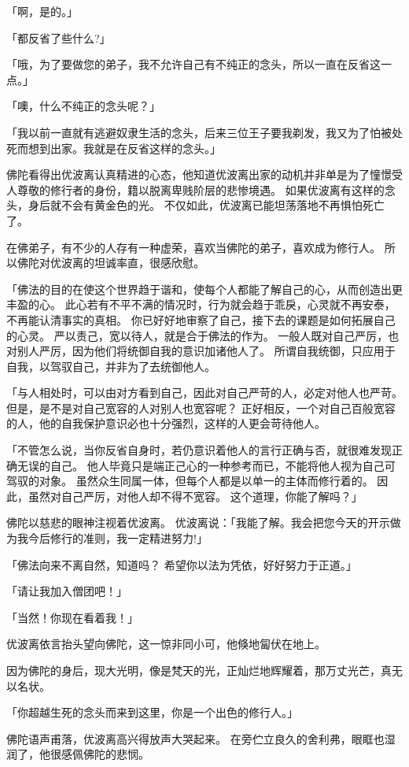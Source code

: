 \documentclass[twoside,openany]{book}
\begin{document}
「啊，是的。」

「都反省了些什么?」

「哦，为了要做您的弟子，我不允许自己有不纯正的念头，所以一直在反省这一点。」

「噢，什么不纯正的念头呢？」

「我以前一直就有逃避奴隶生活的念头，后来三位王子要我剃发，我又为了怕被处死而想到出家。我就是在反省这样的念头。」

佛陀看得出优波离认真精进的心态，他知道优波离出家的动机并非单是为了憧憬受人尊敬的修行者的身份，籍以脱离卑贱阶层的悲惨境遇。
如果优波离有这样的念头，身后就不会有黄金色的光。
不仅如此，优波离已能坦荡落地不再惧怕死亡了。

在佛弟子，有不少的人存有一种虚荣，喜欢当佛陀的弟子，喜欢成为修行人。
所以佛陀对优波离的坦诚率直，很感欣慰。

「佛法的目的在使这个世界趋于谐和，使每个人都能了解自己的心，从而创造出更丰盈的心。
此心若有不平不满的情况时，行为就会趋于乖戾，心灵就不再安泰，不再能认清事实的真相。
你已好好地审察了自己，接下去的课题是如何拓展自己的心灵。
严以责己，宽以待人，就是合于佛法的作为。
一般人既对自己严厉，也对别人严厉，因为他们将统御自我的意识加诸他人了。
所谓自我统御，只应用于自我，以驾驭自己，并非为了去统御他人。

「与人相处时，可以由对方看到自己，因此对自己严苛的人，必定对他人也严苛。
但是，是不是对自己宽容的人对别人也宽容呢？
正好相反，一个对自己百般宽容的人，他的自我保护意识必也十分强烈，这样的人更会苛待他人。

「不管怎么说，当你反省自身时，若仍意识着他人的言行正确与否，就很难发现正确无误的自己。
他人毕竟只是端正己心的一种参考而已，不能将他人视为自己可驾驭的对象。
虽然众生同属一体，但每个人都是以单一的主体而修行着的。
因此，虽然对自己严厉，对他人却不得不宽容。
这个道理，你能了解吗？」

佛陀以慈悲的眼神注视着优波离。
优波离说：「我能了解。我会把您今天的开示做为我今后修行的准则，我一定精进努力!」

「佛法向来不离自然，知道吗？
希望你以法为凭依，好好努力于正道。」

「请让我加入僧团吧！」

「当然！你现在看着我！」

优波离依言抬头望向佛陀，这一惊非同小可，他倏地匐伏在地上。

因为佛陀的身后，现大光明，像是梵天的光，正灿烂地辉耀着，那万丈光芒，真无以名状。

「你超越生死的念头而来到这里，你是一个出色的修行人。」

佛陀语声甫落，优波离高兴得放声大哭起来。
在旁伫立良久的舍利弗，眼眶也湿润了，他很感佩佛陀的悲悯。
\end{document}

